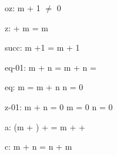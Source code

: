 \documentclass[a4paper]{article}
\begin{document}
oz: 
 \Fol m + 1 $\neq$ 0



z: 
  + m = m



succ: 
 \Fol m +1 = m + 1



eq-01: 
 \Fol m + n = m +  \Equiv n = 



eq: 
 \Fol m = m + n \Equiv n = 0



z-01: 
 \Fol m + n = 0 \Equiv m = 0 \And n = 0



a: 
 \Fol (m + ) +  = m +  + 



c: 
 \Fol m + n = n + m
\end{document}
